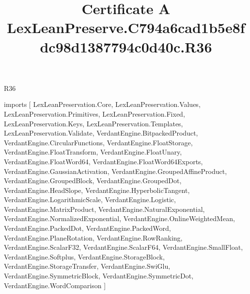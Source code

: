 \begin{lexlean}{R36}
\title{Certificate A LexLeanPreserve.C794a6cad1b5e8fdc98d1387794c0d40c.R36}
\begin{coremodule}
imports [
  LexLeanPreservation.Core,
  LexLeanPreservation.Values,
  LexLeanPreservation.Primitives,
  LexLeanPreservation.Fixed,
  LexLeanPreservation.Keys,
  LexLeanPreservation.Templates,
  LexLeanPreservation.Validate,
  VerdantEngine.BitpackedProduct,
  VerdantEngine.CircularFunctions,
  VerdantEngine.FloatStorage,
  VerdantEngine.FloatTransform,
  VerdantEngine.FloatUnary,
  VerdantEngine.FloatWord64,
  VerdantEngine.FloatWord64Exports,
  VerdantEngine.GaussianActivation,
  VerdantEngine.GroupedAffineProduct,
  VerdantEngine.GroupedBlock,
  VerdantEngine.GroupedDot,
  VerdantEngine.HeadSlope,
  VerdantEngine.HyperbolicTangent,
  VerdantEngine.LogarithmicScale,
  VerdantEngine.Logistic,
  VerdantEngine.MatrixProduct,
  VerdantEngine.NaturalExponential,
  VerdantEngine.NormalizedExponential,
  VerdantEngine.OnlineWeightedMean,
  VerdantEngine.PackedDot,
  VerdantEngine.PackedWord,
  VerdantEngine.PlaneRotation,
  VerdantEngine.RowRanking,
  VerdantEngine.ScalarF32,
  VerdantEngine.ScalarF64,
  VerdantEngine.SmallFloat,
  VerdantEngine.Softplus,
  VerdantEngine.StorageBlock,
  VerdantEngine.StorageTransfer,
  VerdantEngine.SwiGlu,
  VerdantEngine.SymmetricBlock,
  VerdantEngine.SymmetricDot,
  VerdantEngine.WordComparison
]


\end{coremodule}
\end{lexlean}
